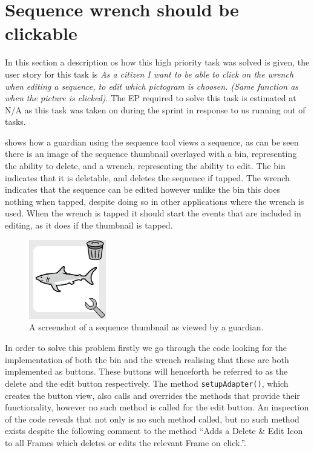 \section{Sequence wrench should be clickable}
In this section a description os how this high priority task was solved is given, the user story for this task is \textit{As a citizen I want to be able to click on the wrench when editing a sequence, to edit which pictogram is choosen. (Same function as when the picture is clicked)}.
The EP required to solve this task is estimated at N/A as this task was taken on during the sprint in response to us running out of tasks.

 shows how a guardian using the sequence tool views a sequence, as can be seen there is an image of the sequence thumbnail overlayed with a bin, representing the ability to delete, and a wrench, representing the ability to edit.
The bin indicates that it is deletable, and deletes the sequence if tapped.
The wrench indicates that the sequence can be edited however unlike the bin this does nothing when tapped, despite doing so in other applications where the wrench is used.
When the wrench is tapped it should start the events that are included in editing, as it does if the thumbnail is tapped.
\begin{figure}
    \centering
    \includegraphics[width=0.3\textwidth]{figures/img/screenshots/sequence_pictogram.png} 
    \caption{A screenshot of a sequence thumbnail as viewed by a guardian.}
    \label{fig:seq_wrench} 
    \vspace{10pt}
\end{figure}
\bigskip
\noindent
In order to solve this problem firstly we go through the code looking for the implementation of both the bin and the wrench realising that these are both implemented as buttons.
These buttons will henceforth be referred to as the delete and the edit button respectively.
The method \texttt{setupAdapter()}, which creates the button view, also calls and overrides the methods that provide their functionality, however no such method is called for the edit button.
An inspection of the code reveals that not only is no such method called, but no such method exists despite the following comment to the method ``\/\/Adds a Delete \& Edit Icon to all Frames which deletes or edits the relevant Frame on click.''.

